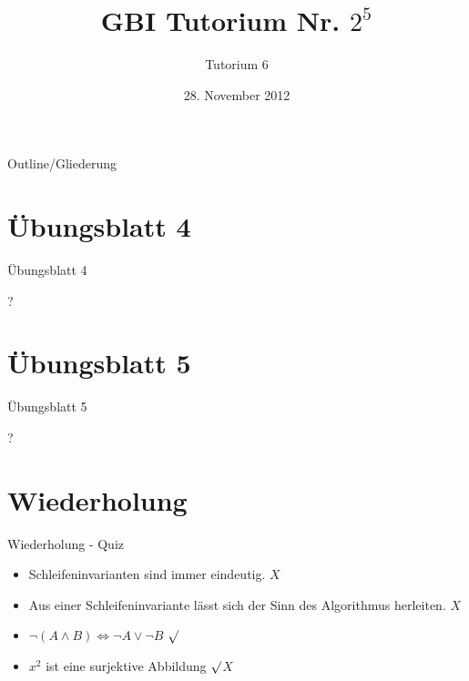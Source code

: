 

\title[Tutorium 6]{GBI Tutorium Nr. $2^5$}
\subtitle{Tutorium 6}
\date{28. November 2012}






	\begin{frame}
		\titlepage
	\end{frame}

	\begin{frame}{Outline/Gliederung}
		\tableofcontents
	\end{frame}
	
	
	\section{\"Ubungsblatt 4}
	\begin{frame} {Übungsblatt 4}
		\begin{center}
			\Huge ?
		\end{center}
	\end{frame}	
	
	
	\section{\"Ubungsblatt 5}
	\begin{frame} {Übungsblatt 5}
		\begin{center}
			\Huge ?
		\end{center}
	\end{frame}	
		
	
	
	
	\section{Wiederholung} 
	\begin{frame} {Wiederholung - Quiz}
		\begin{itemize}
			\item Schleifeninvarianten sind immer eindeutig. 
			\only<2-> {\color{red}$X$}\\
			\color{black}
					
			\item Aus einer Schleifeninvariante lässt sich der Sinn des Algorithmus herleiten.
			\only<3-> {\color{red}$X$}\\
			\color{black}
	
			\item $\neg (A \land B) \Leftrightarrow \neg A \lor \neg B$
			\only<4-> {\color{darkgreen}$\surd$}\\
			\color{black}
			
			\item $x^2$ ist eine surjektive Abbildung
			\only<5-> {\color{darkgreen}$\surd$\color{red}$X$}\\
			\color{black}
		\end{itemize}
	\end{frame}
	
